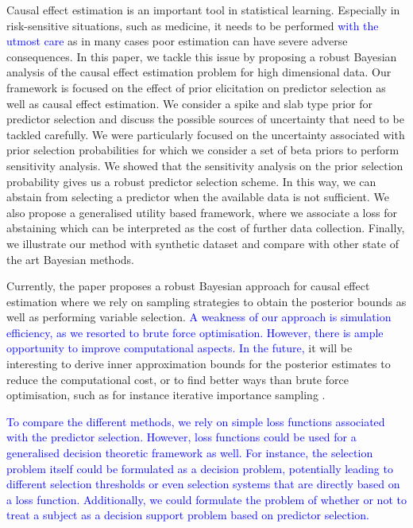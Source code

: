 \documentclass[preprint,12pt]{elsarticle}
\newcommand{\added}[1]{\textcolor{blue}{#1}}
\begin{document}
Causal effect estimation is an important tool in statistical learning.
Especially in risk-sensitive situations, such as medicine, it needs to
be performed \added{with the utmost care} as in many cases poor estimation can have severe adverse consequences.
In this paper, we tackle this issue by proposing a robust Bayesian analysis of the causal 
effect estimation problem for high dimensional data. Our 
framework is focused on the effect of prior elicitation on
predictor selection
as well as causal effect estimation. We consider a spike and slab type
prior for predictor selection and discuss the possible sources of uncertainty that
need to be tackled carefully. We were particularly focused on the uncertainty associated
with prior selection probabilities for which we consider a set of beta priors to perform
sensitivity analysis. We showed that the sensitivity analysis on the prior selection probability
gives us a robust predictor selection scheme. In this way, we can abstain from selecting
a predictor when the available data is not sufficient. We also propose a generalised
utility based framework, where we associate a loss for abstaining which can be interpreted 
as the cost of further data collection. Finally, we illustrate our method with synthetic dataset
and compare with other state of the art Bayesian methods. 


Currently, the paper proposes a robust Bayesian approach for causal effect estimation where
we rely on sampling strategies to obtain the posterior bounds as well as performing 
variable selection.
\added{%
A weakness of our approach is simulation efficiency,
as we resorted to brute force optimisation.
However, there is ample opportunity to improve computational aspects.%
}
\added{In the future,} it will be interesting to derive inner approximation bounds
for the posterior estimates to reduce the computational cost,
or to find better ways than brute force optimisation, such as for instance iterative importance sampling \citep{cruz22_importance}.

\added{To compare the different methods, we rely on simple loss functions
associated with the predictor selection. However,
loss functions could be used for a generalised
decision theoretic framework as well.
For instance,
the selection problem itself could be formulated as a decision problem,
potentially leading to different selection thresholds or even selection systems that are directly based on a loss function.
Additionally, we could formulate the 
problem of whether or not to treat a subject as a decision support problem
based on predictor selection.%
}
\end{document}
